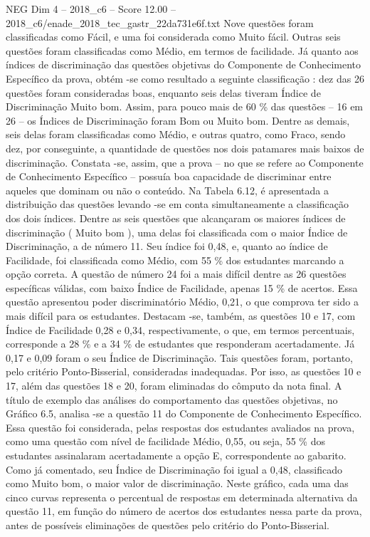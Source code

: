 \begin{textsample}{NEG Dim 4 – 2018\_c6 – Score 12.00 – 2018\_c6/enade\_2018\_tec\_gastr\_22da731e6f.txt}
Nove questões foram classificadas como Fácil, e uma foi considerada como Muito fácil.
Outras seis questões foram classificadas como Médio, em termos de facilidade.
Já quanto aos índices de discriminação das questões objetivas do Componente de Conhecimento Específico da prova, obtém -se como resultado a seguinte classificação : dez das 26 questões foram consideradas boas, enquanto seis delas tiveram Índice de Discriminação Muito bom.
Assim, para pouco mais de 60 \% das questões – 16 em 26 – os Índices de Discriminação foram Bom ou Muito bom.
Dentre as demais, seis delas foram classificadas como Médio, e outras quatro, como Fraco, sendo dez, por conseguinte, a quantidade de questões nos dois patamares mais baixos de discriminação.
Constata -se, assim, que a prova – no que se refere ao Componente de Conhecimento Específico – possuía boa capacidade de discriminar entre aqueles que dominam ou não o conteúdo.
Na Tabela 6.12, é apresentada a distribuição das questões levando -se em conta simultaneamente a classificação dos dois índices.
Dentre as seis questões que alcançaram os maiores índices de discriminação ( Muito bom ), uma delas foi classificada com o maior Índice de Discriminação, a de número 11.
Seu índice foi 0,48, e, quanto ao índice de Facilidade, foi classificada como Médio, com 55 \% dos estudantes marcando a opção correta.
A questão de número 24 foi a mais difícil dentre as 26 questões específicas válidas, com baixo Índice de Facilidade, apenas 15 \% de acertos.
Essa questão apresentou poder discriminatório Médio, 0,21, o que comprova ter sido a mais difícil para os estudantes.
Destacam -se, também, as questões 10 e 17, com Índice de Facilidade 0,28 e 0,34, respectivamente, o que, em termos percentuais, corresponde a 28 \% e a 34 \% de estudantes que responderam acertadamente.
Já 0,17 e 0,09 foram o seu Índice de Discriminação.
Tais questões foram, portanto, pelo critério Ponto-Bisserial, consideradas inadequadas.
Por isso, as questões 10 e 17, além das questões 18 e 20, foram eliminadas do cômputo da nota final.
A título de exemplo das análises do comportamento das questões objetivas, no Gráfico 6.5, analisa -se a questão 11 do Componente de Conhecimento Específico.
Essa questão foi considerada, pelas respostas dos estudantes avaliados na prova, como uma questão com nível de facilidade Médio, 0,55, ou seja, 55 \% dos estudantes assinalaram acertadamente a opção E, correspondente ao gabarito.
Como já comentado, seu Índice de Discriminação foi igual a 0,48, classificado como Muito bom, o maior valor de discriminação.
Neste gráfico, cada uma das cinco curvas representa o percentual de respostas em determinada alternativa da questão 11, em função do número de acertos dos estudantes nessa parte da prova, antes de possíveis eliminações de questões pelo critério do Ponto-Bisserial.

\end{textsample}
